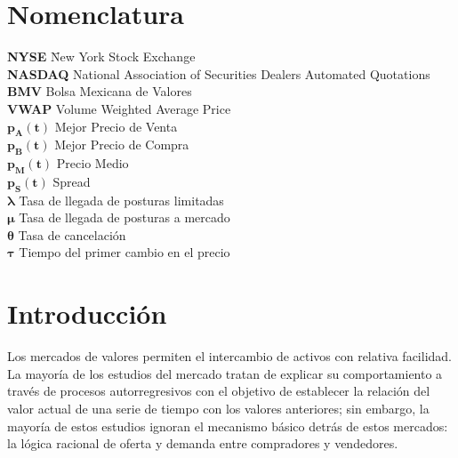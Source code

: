 \documentclass[11pt]{article}
\numberwithin{equation}{section} %
\begin{document}
\thispagestyle{empty}
\tableofcontents
\clearpage

\thispagestyle{empty}
\listoffigures
\clearpage

\thispagestyle{empty}
\listoftables
\clearpage

\thispagestyle{empty}
\section*{Nomenclatura}

\noindent
\begin{tabbing}
\textbf{NYSE} \hspace{1cm} \= New York Stock Exchange\\
\textbf{NASDAQ} \> National Association of Securities Dealers Automated Quotations\\
\textbf{BMV} \> Bolsa Mexicana de Valores\\
\textbf{VWAP} \> Volume Weighted Average Price\\
$\mathbf{p_A(t)}$ \> Mejor Precio de Venta\\
$\mathbf{p_B(t)}$ \> Mejor Precio de Compra\\
$\mathbf{p_M(t)}$ \> Precio Medio\\
$\mathbf{p_S(t)}$ \> Spread\\
$\mathbf{\lambda}$ \> Tasa de llegada de posturas limitadas\\
$\mathbf{\mu}$ \> Tasa de llegada de posturas a mercado\\
$\mathbf{\theta}$ \> Tasa de cancelación\\
$\mathbf{\tau}$ \> Tiempo del primer cambio en el precio\\
\end{tabbing}

\clearpage

\setcounter{page}{1}

\section{Introducción}

Los mercados de valores permiten el intercambio de activos con relativa facilidad. La mayoría de los estudios del mercado tratan de explicar su comportamiento a través de procesos autorregresivos con el objetivo de establecer la relación del valor actual de una serie de tiempo con los valores anteriores; sin embargo, la mayoría de estos estudios ignoran el mecanismo básico detrás de estos mercados: la lógica racional de oferta y demanda entre compradores y vendedores.\\
\end{document}
